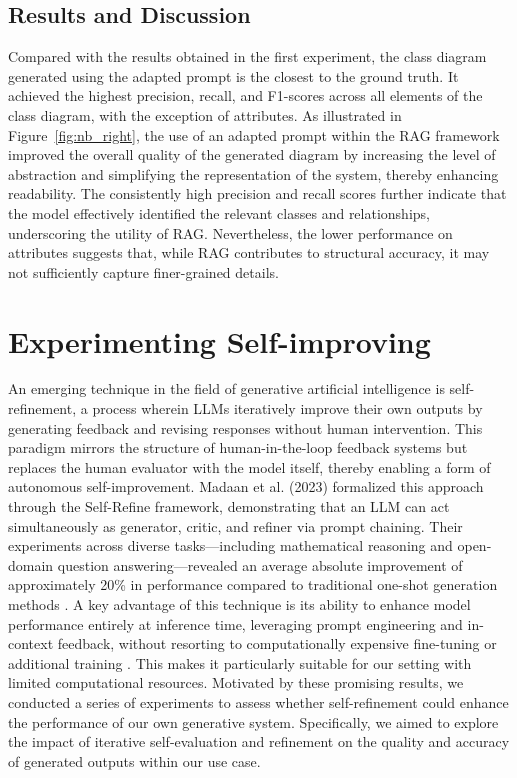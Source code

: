\subsection{Results and Discussion}
Compared with the results obtained in the first experiment, the class diagram generated using the adapted prompt is the closest to the ground truth. It achieved the highest precision, recall, and F1-scores across all elements of the class diagram, with the exception of attributes. As illustrated in Figure~\ref{fig:nb_right}, the use of an adapted prompt within the RAG framework improved the overall quality of the generated diagram by increasing the level of abstraction and simplifying the representation of the system, thereby enhancing readability. The consistently high precision and recall scores further indicate that the model effectively identified the relevant classes and relationships, underscoring the utility of RAG. Nevertheless, the lower performance on attributes suggests that, while RAG contributes to structural accuracy, it may not sufficiently capture finer-grained details.
\section{Experimenting Self-improving}
An emerging technique in the field of generative artificial intelligence is self-refinement, a process wherein LLMs iteratively improve their own outputs by generating feedback and revising responses without human intervention. This paradigm mirrors the structure of human-in-the-loop feedback systems but replaces the human evaluator with the model itself, thereby enabling a form of autonomous self-improvement.
Madaan et al. (2023) formalized this approach through the Self-Refine framework, demonstrating that an LLM can act simultaneously as generator, critic, and refiner via prompt chaining. Their experiments across diverse tasks—including mathematical reasoning and open-domain question answering—revealed an average absolute improvement of approximately 20\% in performance compared to traditional one-shot generation methods \cite{NEURIPS2023_91edff07}.
A key advantage of this technique is its ability to enhance model performance entirely at inference time, leveraging prompt engineering and in-context feedback, without resorting to computationally expensive fine-tuning or additional training \cite{NEURIPS2023_91edff07}. This makes it particularly suitable for our setting with limited computational resources. 
Motivated by these promising results, we conducted a series of experiments to assess whether self-refinement could enhance the performance of our own generative system. Specifically, we aimed to explore the impact of iterative self-evaluation and refinement on the quality and accuracy of generated outputs within our use case.

